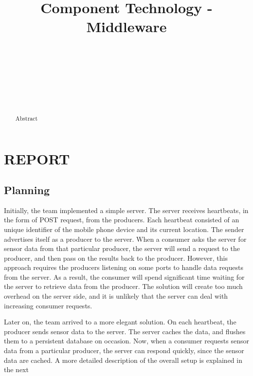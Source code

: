 \documentclass{sigchi}
\begin{document}
\title{Component Technology - Middleware}

\author{
  \\
    \\
    \\
  \\
    \\
    \\
}

\maketitle

\begin{abstract}
Abstract
\end{abstract}

\section{REPORT}

\subsection{Planning}

Initially, the team implemented a simple server. The server receives heartbeats, in the form of POST request, from the producers. Each heartbeat consisted of an unique identifier of the mobile phone device and its current location. The sender advertises itself as a producer to the server. When a consumer asks the server for sensor data from that particular producer, the server will send a request to the producer, and then pass on the results back to the producer. However, this approach requires the producers listening on some ports to handle data requests from the server. As a result, the consumer will spend significant time waiting for the server to retrieve data from the producer. The solution will create too much overhead on the server side, and it is unlikely that the server can deal with increasing consumer requests.

Later on, the team arrived to a more elegant solution. On each heartbeat, the producer sends sensor data to the server. The server caches the data, and flushes them to a persistent database on occasion. Now, when a consumer requests sensor data from a particular producer, the server can respond quickly, since the sensor data are cached. A more detailed description of the overall setup is explained in the next
\end{document}
